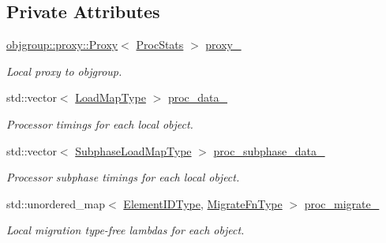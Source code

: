 \subsection*{Private Attributes}
\begin{DoxyCompactItemize}
\item 
\hyperlink{structvt_1_1objgroup_1_1proxy_1_1_proxy}{objgroup\+::proxy\+::\+Proxy}$<$ \hyperlink{structvt_1_1vrt_1_1collection_1_1balance_1_1_proc_stats}{Proc\+Stats} $>$ \hyperlink{structvt_1_1vrt_1_1collection_1_1balance_1_1_proc_stats_a117dfc074ac943a1a8493f150ff35a00}{proxy\+\_\+}
\begin{DoxyCompactList}\small\item\em Local proxy to objgroup. \end{DoxyCompactList}\item 
std\+::vector$<$ \hyperlink{structvt_1_1vrt_1_1collection_1_1balance_1_1_proc_stats_aa810fd21680061ec5d50f6526f66be31}{Load\+Map\+Type} $>$ \hyperlink{structvt_1_1vrt_1_1collection_1_1balance_1_1_proc_stats_a62c01980c4f0eadf09dc29615301234d}{proc\+\_\+data\+\_\+}
\begin{DoxyCompactList}\small\item\em Processor timings for each local object. \end{DoxyCompactList}\item 
std\+::vector$<$ \hyperlink{structvt_1_1vrt_1_1collection_1_1balance_1_1_proc_stats_ab2312e47e475143cf295d45cb2493f48}{Subphase\+Load\+Map\+Type} $>$ \hyperlink{structvt_1_1vrt_1_1collection_1_1balance_1_1_proc_stats_a88775bda69065a391970251f5e7b3264}{proc\+\_\+subphase\+\_\+data\+\_\+}
\begin{DoxyCompactList}\small\item\em Processor subphase timings for each local object. \end{DoxyCompactList}\item 
std\+::unordered\+\_\+map$<$ \hyperlink{namespacevt_1_1vrt_1_1collection_1_1balance_a14c8d2c972f2913aa3f1636e5be0a120}{Element\+I\+D\+Type}, \hyperlink{structvt_1_1vrt_1_1collection_1_1balance_1_1_proc_stats_a7cb065ac4de218cb717bc2634782f0cb}{Migrate\+Fn\+Type} $>$ \hyperlink{structvt_1_1vrt_1_1collection_1_1balance_1_1_proc_stats_aaf05ac7876d1896f5a640dddbc5a4b60}{proc\+\_\+migrate\+\_\+}
\begin{DoxyCompactList}\small\item\em Local migration type-\/free lambdas for each object. \end{DoxyCompactList}\item 

\end{DoxyCompactItemize}
